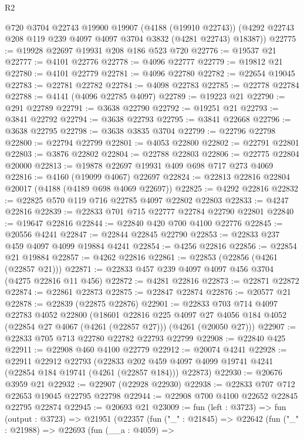 \begin{lexlean}{R2}
\begin{coremodule}
      @720
      @3704
      @22743
      @19900
      @19907
      (@4188 (@19910 @22743))
      (@4292 @22743 @208 @119 @239 @4097 @4097 @3704 @3832 (@4281 @22743) @18387))
@22775 := @19928 @22697 @19931 @208 @186 @523 @720
@22776 := @19537 @21
@22777 := @4101 @22776
@22778 := @4096 @22777
@22779 := @19812 @21
@22780 := @4101 @22779
@22781 := @4096 @22780
@22782 := @22654 @19045
@22783 := @22781 @22782
@22784 := @4098 @22783
@22785 := @22778 @22784
@22788 := @4141 (@4096 @22785 @4097)
@22789 := @19223 @21
@22790 := @291 @22789
@22791 := @3638 @22790
@22792 := @19251 @21
@22793 := @3841 @22792
@22794 := @3638 @22793
@22795 := @3841 @22668
@22796 := @3638 @22795
@22798 := @3638 @3835 @3704
@22799 := @22796 @22798
@22800 := @22794 @22799
@22801 := @4053 @22800
@22802 := @22791 @22801
@22803 := @3876 @22802
@22804 := @22788 @22803
@22806 := @22775 @22804 @20000
@22813 := @19878 @22697 @19931 @409 @698 @717 @273 @4069
@22816 := @4160 (@19099 @4067) @22697
@22824 := @22813 @22816 @22804 @20017 (@4188 (@4189 @698 @4069 @22697))
@22825 := @4292 @22816
@22832 := @22825 @570 @119 @716 @22785 @4097 @22802 @22803
@22833 := @4247 @22816
@22839 := @22833 @701 @715 @22777 @22784 @22790 @22801
@22840 := @19647 @22816
@22844 := @22840 @420 @700 @4100 @22776
@22845 := @20556 @4241
@22847 := @22844 @22845 @22790
@22853 := @22833 @237 @459 @4097 @4099 @19884 @4241
@22854 := @4256 @22816
@22856 := @22854 @21 @19884
@22857 := @4262 @22816
@22861 := @22853 (@22856 (@4261 (@22857 @21)))
@22871 := @22833 @457 @239 @4097 @4097 @456 @3704 (@4275 @22816 @11 @456)
@22872 := @4281 @22816
@22873 := @22871 @22872
@22874 := @22861 @22873
@22875 := @22847 @22874
@22876 := @20577 @21
@22878 := @22839 (@22875 @22876)
@22901 := @22833
    @703
    @714
    @4097
    @22783
    @4052
    @22800
    (@18601
      @22816
      @225
      @4097
      @27
      @4056
      @184
      @4052
      (@22854 @27 @4067 (@4261 (@22857 @27)))
      (@4261 (@20050 @27)))
@22907 := @22833 @705 @713 @22780 @22782 @22793 @22799
@22908 := @22840 @425
@22911 := @22908 @460 @4100 @22779
@22912 := @20074 @4241
@22928 := @22911
    @22912
    @22793
    (@22833 @202 @459 @4097 @4099 @19741 @4241 (@22854 @184 @19741 (@4261 (@22857 @184))) @22873)
@22930 := @20676 @3959 @21
@22932 := @22907 (@22928 @22930)
@22938 := @22833 @707 @712 @22653 @19045 @22795 @22798
@22944 := @22908 @700 @4100 @22652 @22845 @22795 @22874
@22945 := @20693 @21
@23009 := fun (left : @3723) =>
  fun (output : @3723) =>
  @21951
    (@22357
      (fun ("_" : @21845) =>
      @22642
        (fun ("_" : @21988) =>
        @22693
          (fun (__a : @4059) =>

\end{coremodule}
\end{lexlean}
